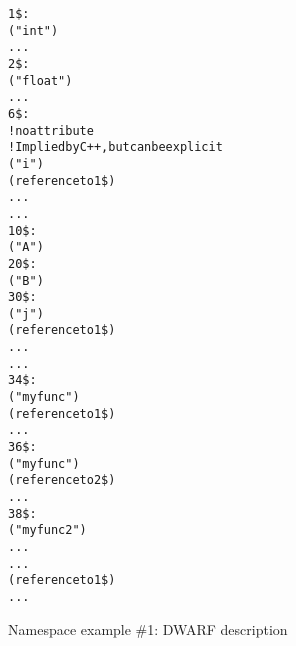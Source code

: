 \begin{figure}[p]
\begin{dwflisting}
\begin{alltt}

1\$:   \DWTAGbasetype
          \DWATname("int")
          ...
2\$:   \DWTAGbasetype
          \DWATname("float")
          ...
6\$:   \DWTAGnamespace
          ! no \DWATname attribute
          \DWATexportsymbols              ! Implied by C++, but can be explicit
          \DWTAGvariable
              \DWATname("i")
              \DWATtype(reference to 1\$)
              \DWATlocation ...
              ...
10\$:  \DWTAGnamespace
          \DWATname("A")
20\$:      \DWTAGnamespace
              \DWATname("B")
30\$:          \DWTAGvariable
                  \DWATname("j")
                  \DWATtype(reference to 1\$)
                  \DWATlocation ...
                  ...
34\$:          \DWTAGsubprogram
                  \DWATname("myfunc")
                  \DWATtype(reference to 1\$)
                  ...
36\$:          \DWTAGsubprogram
                  \DWATname("myfunc")
                  \DWATtype(reference to 2\$)
                  ...
38\$:          \DWTAGsubprogram
                  \DWATname("myfunc2")
                  \DWATlowpc ...
                  \DWAThighpc ...
                  \DWATtype(reference to 1\$)
                  ...
\end{alltt}
\end{dwflisting}
\caption{Namespace example \#1: DWARF description}
\label{fig:namespaceexample1dwarfdescription}
\end{figure}

